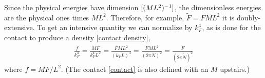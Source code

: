 Since the physical energies have dimension $[(ML^2)^{-1}]$, the dimensionless energies are the physical ones times $ML^2$.
Therefore, for example, $\tilde{F} = F ML^2$ it is doubly-extensive.
To get an intensive quantity we can normalize by $k_F^4$, as is done for the contact to produce a density \eqref{contact density},
\begin{align}
	\frac{f}{k_F^4} = \frac{MF}{k_F^4 L^2} = \frac{FML^2}{(k_F L)^4} = \frac{FML^2}{(2\pi N)^2} = \frac{\tilde{F}}{(2\pi\tilde{N})^2}
	\label{eq:free energy density}
\end{align}
where $f=MF/L^2$.  (The contact \eqref{contact} is also defined with an $M$ upstairs.)

